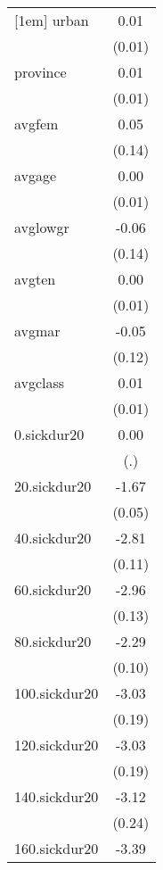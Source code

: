 \documentclass{article}
\begin{document}
{\begin{tabular}{l*{1}{c}}
[1em]
urban       &        0.01         \\
            &      (0.01)         \\
[1em]
province    &        0.01         \\
            &      (0.01)         \\
[1em]
avgfem      &        0.05         \\
            &      (0.14)         \\
[1em]
avgage      &        0.00         \\
            &      (0.01)         \\
[1em]
avglowgr    &       -0.06         \\
            &      (0.14)         \\
[1em]
avgten      &        0.00         \\
            &      (0.01)         \\
[1em]
avgmar      &       -0.05         \\
            &      (0.12)         \\
[1em]
avgclass    &        0.01\sym{*}  \\
            &      (0.01)         \\
[1em]
0.sickdur20 &        0.00         \\
            &         (.)         \\
[1em]
20.sickdur20&       -1.67\sym{***}\\
            &      (0.05)         \\
[1em]
40.sickdur20&       -2.81\sym{***}\\
            &      (0.11)         \\
[1em]
60.sickdur20&       -2.96\sym{***}\\
            &      (0.13)         \\
[1em]
80.sickdur20&       -2.29\sym{***}\\
            &      (0.10)         \\
[1em]
100.sickdur20&       -3.03\sym{***}\\
            &      (0.19)         \\
[1em]
120.sickdur20&       -3.03\sym{***}\\
            &      (0.19)         \\
[1em]
140.sickdur20&       -3.12\sym{***}\\
            &      (0.24)         \\
[1em]
160.sickdur20&       -3.39\sym{***}\\

\end{tabular}}
\end{document}
